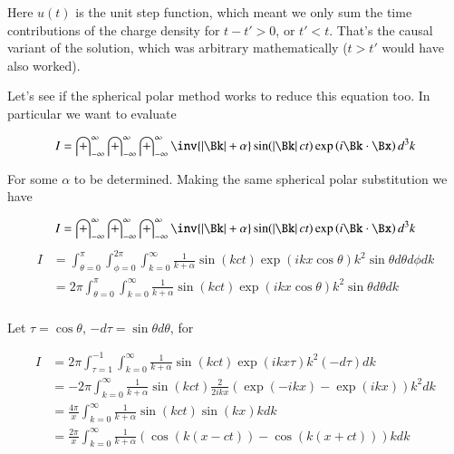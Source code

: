 \documentclass{article}
\newcommand{\IIinf}[0]{ \int_{-\infty}^\infty }
\begin{document}
Here $u(t)$ is the unit step function, which meant we only sum the time contributions of the charge density for $t - t' > 0$, or $t' < t$.  That's the causal variant of the solution, which was arbitrary mathematically ($t > t'$ would have also worked).

Let's see if the spherical polar method works to reduce this equation too.  In particular we want to evaluate

\begin{align*}
I = \IIinf \IIinf \IIinf \inv{\Abs{\Bk} + \alpha} \sin( \Abs{\Bk} c t ) \exp\left( i \Bk \cdot \Bx \right) d^3 k
\end{align*}

For some $\alpha$ to be determined.  Making the same spherical polar substitution we have

\begin{align*}
I = \IIinf \IIinf \IIinf \inv{\Abs{\Bk} + \alpha} \sin( \Abs{\Bk} c t ) \exp\left( i \Bk \cdot \Bx \right) d^3 k
\end{align*}
\begin{align*}
I 
&= \int_{\theta=0}^{\pi} \int_{\phi=0}^{2\pi} \int_{k=0}^\infty \frac{1}{k + \alpha} 
\sin\left( k c t \right) \exp\left( i k x \cos\theta \right) 
k^2 \sin\theta d\theta d\phi dk \\
&= 2 \pi \int_{\theta=0}^{\pi} \int_{k=0}^\infty \frac{1}{k + \alpha} 
\sin\left( k c t \right) \exp\left( i k x \cos\theta \right) 
k^2 \sin\theta d\theta dk \\
\end{align*}

Let $\tau = \cos\theta$, $-d\tau = \sin\theta d\theta$, for

\begin{align*}
I 
&= 2 \pi \int_{\tau=1}^{-1} \int_{k=0}^\infty \frac{1}{k + \alpha} 
\sin\left( k c t \right) \exp\left( i k x \tau \right) 
k^2 (-d\tau) dk \\
&= -2 \pi \int_{k=0}^\infty \frac{1}{k + \alpha} 
\sin\left( k c t \right) 
\frac{2}{2i k x} \left( {\exp\left( -i k x \right) } -{\exp\left( i k x \right) } \right)
k^2 dk \\
&= \frac{4 \pi }{x} \int_{k=0}^\infty \frac{1}{k + \alpha} 
\sin\left( k c t \right) 
\sin\left( k x \right) 
k dk \\
&= \frac{2 \pi }{x} \int_{k=0}^\infty \frac{1}{k + \alpha} 
\left( \cos\left( k (x-c t) \right) -\cos\left( k (x+c t) \right) \right)
k dk \\
\end{align*}
\end{document}
